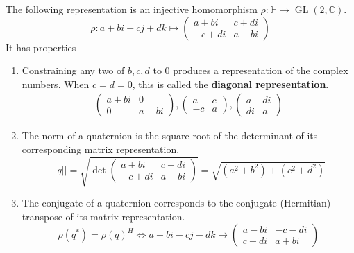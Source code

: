 \documentclass{article}
\DeclareMathOperator{\GL}{GL}
\begin{document}
      \begin{proposition}
        The following representation is an injective homomorphism $\rho: \mathbb{H} \longrightarrow \GL(2, \mathbb{C})$. 
        \begin{equation}
          \rho: a + bi + cj + dk \mapsto \begin{pmatrix}
          a+bi & c+ di \\ -c + di & a - bi
          \end{pmatrix}
        \end{equation}
        It has properties
        \begin{enumerate}
          \item Constraining any two of $b, c, d$ to $0$ produces a representation of the complex numbers. When $c = d = 0$, this is called the \textbf{diagonal representation}. 
          \begin{align*}
            \begin{pmatrix}
            a+bi & 0 \\ 0 & a-bi
            \end{pmatrix},  \begin{pmatrix}
            a & c \\ -c & a
            \end{pmatrix},  \begin{pmatrix}
            a & di \\ di & a
            \end{pmatrix}
          \end{align*}
          \item The norm of a quaternion is the square root of the determinant of its corresponding matrix representation. 
            \begin{equation}
              ||q|| = \sqrt{\det \begin{pmatrix}
              a+bi & c+di \\ -c+di & a-bi
              \end{pmatrix}} = \sqrt{(a^2 + b^2) + (c^2 + d^2)}
            \end{equation}
          \item The conjugate of a quaternion corresponds to the conjugate (Hermitian) transpose of its matrix representation. 
            \begin{equation}
              \rho(q^*) = \rho(q)^H \iff a-bi-cj-dk \mapsto \begin{pmatrix}
              a-bi & -c-di \\ c-di & a+bi

\end{pmatrix}
\end{equation}
\end{enumerate}
\end{proposition}
\end{document}
